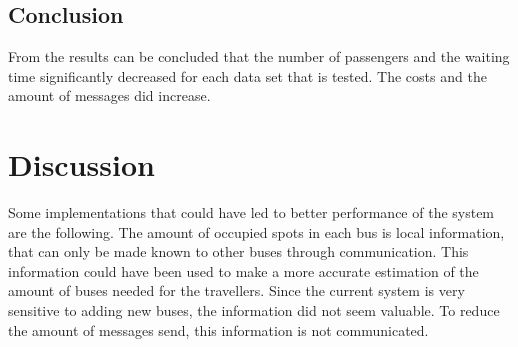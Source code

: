 \documentclass[a4paper]{article}
\begin{document}
\subsection{Conclusion}
From the results can be concluded that the number of passengers and the waiting time significantly decreased for each data set that is tested. The costs and the amount of messages did increase.

\section{Discussion}
Some implementations that could have led to better performance of the system are the following.
\newline
The amount of occupied spots in each bus is local information, that can only be made known to other buses through communication. This information could have been used to make a more accurate estimation of the amount of buses needed for the travellers. Since the current system is very sensitive to adding new buses, the information did not seem valuable. To reduce the amount of messages send, this information is not communicated.

\newpage
\onecolumn


\end{document}
